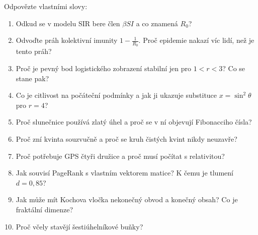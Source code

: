 \begin{problem}
  Odpovězte vlastními slovy:
  \begin{enumerate}
    \item Odkud se v modelu SIR bere člen $\beta SI$ a co znamená $R_0$?
    \item Odvoďte práh kolektivní imunity $1 - \frac{1}{R_0}$. Proč epidemie nakazí víc lidí, než je tento práh?
    \item Proč je pevný bod logistického zobrazení stabilní jen pro $1 < r < 3$? Co se stane pak?
    \item Co je citlivost na počáteční podmínky a jak ji ukazuje substituce $x = \sin^2\theta$ pro $r = 4$?
    \item Proč slunečnice používá zlatý úhel a proč se v ní objevují Fibonacciho čísla?
    \item Proč zní kvinta souzvučně a proč se kruh čistých kvint nikdy neuzavře?
    \item Proč potřebuje GPS čtyři družice a proč musí počítat s relativitou?
    \item Jak souvisí PageRank s vlastním vektorem matice? K čemu je tlumení $d = 0{,}85$?
    \item Jak může mít Kochova vločka nekonečný obvod a konečný obsah? Co je fraktální dimenze?
    \item Proč včely stavějí šestiúhelníkové buňky?
  \end{enumerate}
\end{problem}
